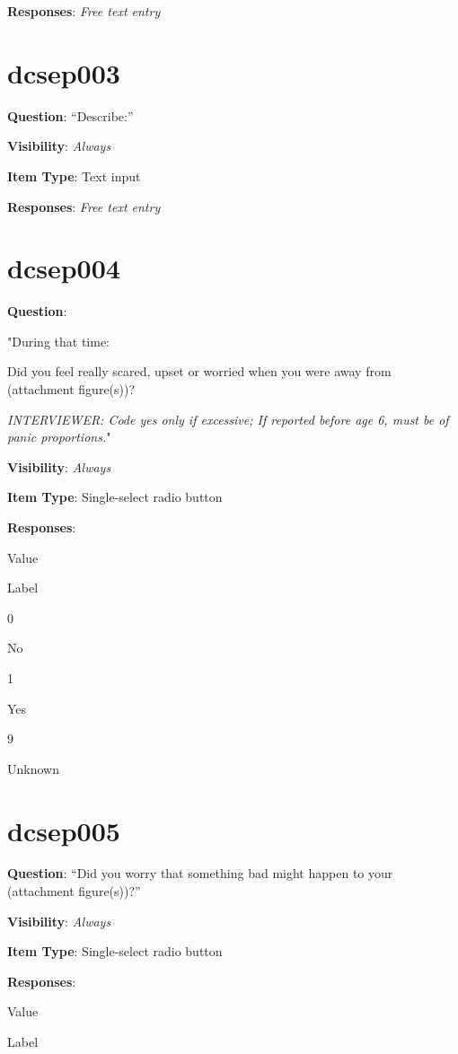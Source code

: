 \documentclass[]{book}
\begin{document}
\textbf{Responses}: \emph{Free text entry}

\hypertarget{dcsep003}{%
\section{dcsep003}\label{dcsep003}}

\textbf{Question}: ``Describe:''

\textbf{Visibility}: \emph{Always}

\textbf{Item Type}: Text input

\textbf{Responses}: \emph{Free text entry}

\hypertarget{dcsep004}{%
\section{dcsep004}\label{dcsep004}}

\textbf{Question}:

"During that time:

Did you feel really scared, upset or worried when you were away from (attachment figure(s))?

\emph{INTERVIEWER: Code yes only if excessive; If reported before age 6, must be of panic proportions.}"

\textbf{Visibility}: \emph{Always}

\textbf{Item Type}: Single-select radio button

\textbf{Responses}:

Value

Label

0

No

1

Yes

9

Unknown

\hypertarget{dcsep005}{%
\section{dcsep005}\label{dcsep005}}

\textbf{Question}: ``Did you worry that something bad might happen to your (attachment figure(s))?''

\textbf{Visibility}: \emph{Always}

\textbf{Item Type}: Single-select radio button

\textbf{Responses}:

Value

Label
\end{document}
